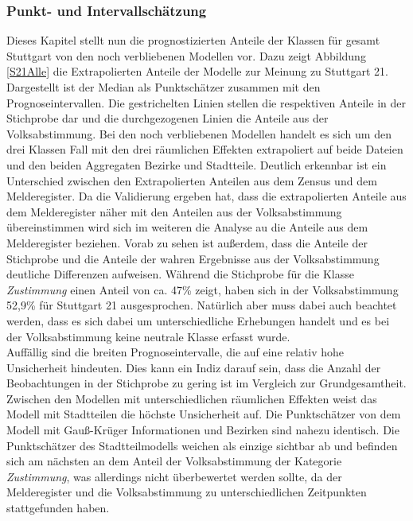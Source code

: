 \documentclass{Vorlage}
\begin{document}
\subsubsection{Punkt- und Intervallschätzung}
Dieses Kapitel stellt nun die prognostizierten Anteile der Klassen für gesamt Stuttgart von den noch verbliebenen Modellen vor. Dazu zeigt Abbildung \ref{S21Alle} die Extrapolierten Anteile der Modelle zur Meinung zu Stuttgart 21. Dargestellt ist der Median als Punktschätzer zusammen mit den Prognoseintervallen. Die gestrichelten Linien stellen die respektiven Anteile in der Stichprobe dar und die durchgezogenen Linien die Anteile aus der Volksabstimmung. Bei den noch verbliebenen Modellen handelt es sich um den drei Klassen Fall mit den drei räumlichen Effekten extrapoliert auf beide Dateien und den beiden Aggregaten Bezirke und Stadtteile. Deutlich erkennbar ist ein Unterschied zwischen den Extrapolierten Anteilen aus dem Zensus und dem Melderegister. Da die Validierung ergeben hat, dass die extrapolierten Anteile aus dem Melderegister näher mit den Anteilen aus der Volksabstimmung übereinstimmen wird sich im weiteren die Analyse au die Anteile aus dem Melderegister beziehen. Vorab zu sehen ist außerdem, dass die Anteile der Stichprobe und die Anteile der wahren Ergebnisse aus der Volksabstimmung deutliche Differenzen aufweisen. Während die Stichprobe für die Klasse \textit{Zustimmung} einen Anteil von ca. 47\% zeigt, haben sich in der Volksabstimmung 52,9\% für Stuttgart 21 ausgesprochen. Natürlich aber muss dabei auch beachtet werden, dass es sich dabei um unterschiedliche Erhebungen handelt und es bei der Volksabstimmung keine neutrale Klasse erfasst wurde.\\
Auffällig sind die breiten Prognoseintervalle, die auf eine relativ hohe Unsicherheit hindeuten. Dies kann ein Indiz darauf sein, dass die Anzahl der Beobachtungen in der Stichprobe zu gering ist im Vergleich zur Grundgesamtheit. Zwischen den Modellen mit unterschiedlichen räumlichen Effekten weist das Modell mit Stadtteilen die höchste Unsicherheit auf. Die Punktschätzer von dem Modell mit Gauß-Krüger Informationen und Bezirken sind nahezu identisch. Die Punktschätzer des Stadtteilmodells weichen als einzige sichtbar ab und befinden sich am nächsten an dem Anteil der Volksabstimmung der Kategorie \textit{Zustimmung}, was allerdings nicht überbewertet werden sollte, da der Melderegister und die Volksabstimmung zu unterschiedlichen Zeitpunkten stattgefunden haben. 
\end{document}
